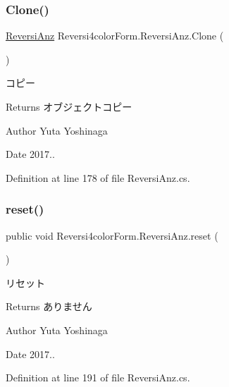 \subsubsection{\texorpdfstring{Clone()}{Clone()}}
{\footnotesize\ttfamily \hyperlink{class_reversi4color_form_1_1_reversi_anz}{Reversi\+Anz} Reversi4color\+Form.\+Reversi\+Anz.\+Clone (\begin{DoxyParamCaption}{ }\end{DoxyParamCaption})}



コピー 

\begin{DoxyReturn}{Returns}
オブジェクトコピー 
\end{DoxyReturn}
\begin{DoxyAuthor}{Author}
Yuta Yoshinaga 
\end{DoxyAuthor}
\begin{DoxyDate}{Date}
2017.. 
\end{DoxyDate}


Definition at line 178 of file Reversi\+Anz.\+cs.

\mbox{\label{class_reversi4color_form_1_1_reversi_anz_abdb9398ace86376d2a9f1f82cf7a2113}} 
\subsubsection{\texorpdfstring{reset()}{reset()}}
{\footnotesize\ttfamily public void Reversi4color\+Form.\+Reversi\+Anz.\+reset (\begin{DoxyParamCaption}{ }\end{DoxyParamCaption})}



リセット 

\begin{DoxyReturn}{Returns}
ありません 
\end{DoxyReturn}
\begin{DoxyAuthor}{Author}
Yuta Yoshinaga 
\end{DoxyAuthor}
\begin{DoxyDate}{Date}
2017.. 
\end{DoxyDate}


Definition at line 191 of file Reversi\+Anz.\+cs.



